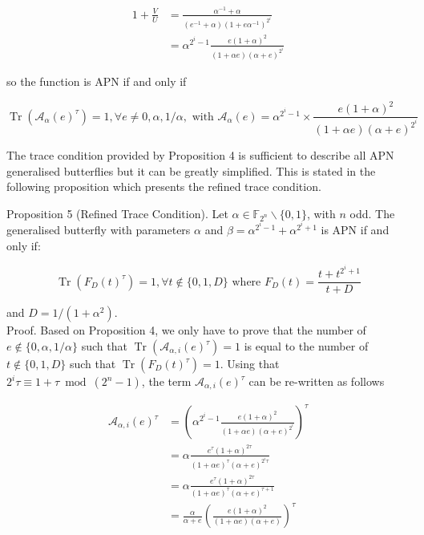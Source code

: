 \documentclass[10pt]{article}
\begin{document}
$$
\begin{aligned}
1+\frac{V}{U} & =\frac{\alpha^{-1}+\alpha}{\left(e^{-1}+\alpha\right)\left(1+e \alpha^{-1}\right)^{2^{i}}} \\
& =\alpha^{2^{i}-1} \frac{e(1+\alpha)^{2}}{(1+\alpha e)(\alpha+e)^{2^{i}}}
\end{aligned}
$$

so the function is APN if and only if

$$
\operatorname{Tr}\left(\mathcal{A}_{\alpha}(e)^{\tau}\right)=1, \forall e \neq 0, \alpha, 1 / \alpha, \text { with } \mathcal{A}_{\alpha}(e)=\alpha^{2^{i}-1} \times \frac{e(1+\alpha)^{2}}{(1+\alpha e)(\alpha+e)^{2^{i}}}
$$

The trace condition provided by Proposition 4 is sufficient to describe all APN generalised butterflies but it can be greatly simplified. This is stated in the following proposition which presents the refined trace condition.

Proposition 5 (Refined Trace Condition). Let $\alpha \in \mathbb{F}_{2^{n}} \backslash\{0,1\}$, with $n$ odd. The generalised butterfly with parameters $\alpha$ and $\beta=\alpha^{2^{i}-1}+\alpha^{2^{i}+1}$ is APN if and only if:

$$
\operatorname{Tr}\left(F_{D}(t)^{\tau}\right)=1, \forall t \notin\{0,1, D\} \text { where } F_{D}(t)=\frac{t+t^{2^{i}+1}}{t+D}
$$

and $D=1 /\left(1+\alpha^{2}\right)$.\\
Proof. Based on Proposition 4, we only have to prove that the number of $e \notin\{0, \alpha, 1 / \alpha\}$ such that $\operatorname{Tr}\left(\mathcal{A}_{\alpha, i}(e)^{\tau}\right)=1$ is equal to the number of $t \notin\{0,1, D\}$ such that $\operatorname{Tr}\left(F_{D}(t)^{\tau}\right)=1$. Using that $2^{i} \tau \equiv 1+\tau \bmod \left(2^{n}-1\right)$, the term $\mathcal{A}_{\alpha, i}(e)^{\tau}$ can be re-written as follows

$$
\begin{aligned}
\mathcal{A}_{\alpha, i}(e)^{\tau} & =\left(\alpha^{2^{i}-1} \frac{e(1+\alpha)^{2}}{(1+\alpha e)(\alpha+e)^{2^{i}}}\right)^{\tau} \\
& =\alpha \frac{e^{\tau}(1+\alpha)^{2 \tau}}{(1+\alpha e)^{\tau}(\alpha+e)^{2^{i} \tau}} \\
& =\alpha \frac{e^{\tau}(1+\alpha)^{2 \tau}}{(1+\alpha e)^{\tau}(\alpha+e)^{\tau+1}} \\
& =\frac{\alpha}{\alpha+e}\left(\frac{e(1+\alpha)^{2}}{(1+\alpha e)(\alpha+e)}\right)^{\tau}
\end{aligned}
$$
\end{document}
